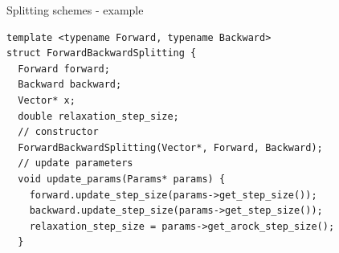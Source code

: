 \documentclass[hyperref,handout,compress,9pt,mathserif]{beamer}
\begin{document}
\begin{frame}[fragile]{Splitting schemes - example}
\begin{small}
\begin{lstlisting}
template <typename Forward, typename Backward>                                                                                                                                       
struct ForwardBackwardSplitting {                                                                                                                                                    
  Forward forward;                                                                                                                                                                   
  Backward backward;                                                                                                                                                                 
  Vector* x;                                                                                                                                                                         
  double relaxation_step_size;                                                                                                                                                       
  // constructor                                                                                                                                                                                   
  ForwardBackwardSplitting(Vector*, Forward, Backward);
  // update parameters                                                                                                                                                                                   
  void update_params(Params* params) {                                                                                                                                               
    forward.update_step_size(params->get_step_size());                                                                                                                               
    backward.update_step_size(params->get_step_size());                                                                                                                              
    relaxation_step_size = params->get_arock_step_size();                                                                                                                            
  }                                                                                                                                                                                  

\end{lstlisting}
\end{small}
\end{frame}
\end{document}
